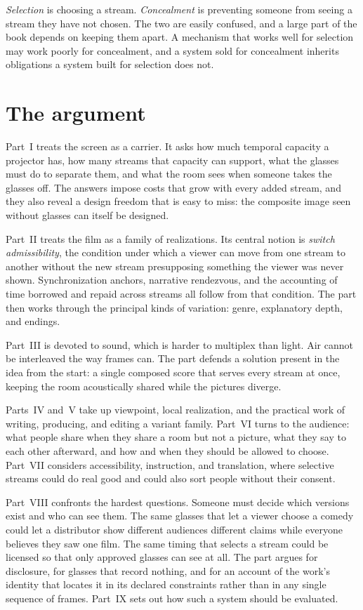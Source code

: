 \emph{Selection} is choosing a stream. \emph{Concealment} is preventing someone from seeing a stream they have not chosen. The two are easily confused, and a large part of the book depends on keeping them apart. A mechanism that works well for selection may work poorly for concealment, and a system sold for concealment inherits obligations a system built for selection does not.

\section*{The argument}

Part~I treats the screen as a carrier. It asks how much temporal capacity a projector has, how many streams that capacity can support, what the glasses must do to separate them, and what the room sees when someone takes the glasses off. The answers impose costs that grow with every added stream, and they also reveal a design freedom that is easy to miss: the composite image seen without glasses can itself be designed.

Part~II treats the film as a family of realizations. Its central notion is \emph{switch admissibility}, the condition under which a viewer can move from one stream to another without the new stream presupposing something the viewer was never shown. Synchronization anchors, narrative rendezvous, and the accounting of time borrowed and repaid across streams all follow from that condition. The part then works through the principal kinds of variation: genre, explanatory depth, and endings.

Part~III is devoted to sound, which is harder to multiplex than light. Air cannot be interleaved the way frames can. The part defends a solution present in the idea from the start: a single composed score that serves every stream at once, keeping the room acoustically shared while the pictures diverge.

Parts~IV and~V take up viewpoint, local realization, and the practical work of writing, producing, and editing a variant family. Part~VI turns to the audience: what people share when they share a room but not a picture, what they say to each other afterward, and how and when they should be allowed to choose. Part~VII considers accessibility, instruction, and translation, where selective streams could do real good and could also sort people without their consent.

Part~VIII confronts the hardest questions. Someone must decide which versions exist and who can see them. The same glasses that let a viewer choose a comedy could let a distributor show different audiences different claims while everyone believes they saw one film. The same timing that selects a stream could be licensed so that only approved glasses can see at all. The part argues for disclosure, for glasses that record nothing, and for an account of the work's identity that locates it in its declared constraints rather than in any single sequence of frames. Part~IX sets out how such a system should be evaluated.

